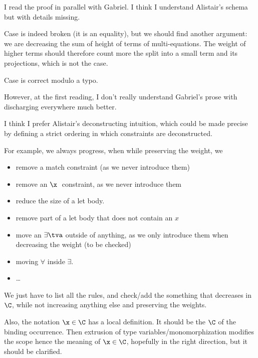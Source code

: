 \documentclass[acmsmall,screen,nonacm,review]{acmart}
\begin{document}
\begin{version}{\color{blue}\Xxx}
I read the proof in parallel with Gabriel.
I think I understand Alistair's schema but with details missing.

Case  is indeed broken (it is an equality), but we should find
another argument: we are decreasing the sum of height of terms of
multi-equations. The weight of higher terms should therefore count more
the split into a small term and its projections, which is not the case.

Case  is correct modulo a typo.

However, at the first reading, I don't really understand Gabriel's prose
with discharging everywhere much better.

I think I prefer Alistair's deconstructing intuition, which could be made
precise by defining a strict ordering in which constraints are
deconstructed.

For example, we always progress, when while preserving the weight,
we
\begin{itemize}

\item remove a match constraint (as we never introduce them)
\item remove an $\x\;\t$ constraint, as we never introduce them
\item reduce the size of a let body.
\item remove part of a let body that does not contain an $x$
\item move an $\exists \tv$ outside of anything, as
      we only introduce them when decreasing the weight (to be checked)
\item moving $\forall$ inside $\exists$.
\item \ldots
\end{itemize}
We just have to list all the rules, and check/add the something
that decreases in $\C$, while not increasing anything else
and preserving the weights.

Also, the notation $\x \in \C$ has a local definition. It should be the $\C$
of the binding occurrence. Then extrusion of type variables/monomorphization
modifies the scope hence the meaning of $\x \in \C$, hopefully in the right
direction, but it should be clarified.
\end{version}
\end{document}

